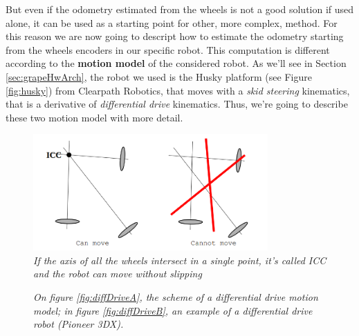 But even if the odometry estimated from the wheels is not a good solution if used alone, it can be used as a starting point for other, more complex, method. For this reason we are now going to descript how to estimate the odometry starting from the wheels encoders in our specific robot. This computation is different according to the \textbf{motion model} of the considered robot. As we'll see in Section \ref{sec:grapeHwArch}, the robot we used is the Husky platform (see Figure \ref{fig:husky}) from Clearpath Robotics, that moves with a  \textit{skid steering} kinematics, that is a derivative of \textit{differential drive} kinematics. Thus, we're going to describe these two motion model with more detail.


\begin{figure}
	\centering
	\includegraphics[width=0.8\textwidth]{Images/background_and_tools/icc.png}
	\caption{\textit{If the axis of all the wheels intersect in a single point, it's called ICC and the robot can move without slipping}}
	\label{fig:icc}
\end{figure}


\begin{figure}
	\centering
	\qquad
	\caption{\textit{On figure \ref{fig:diffDriveA}, the scheme of a differential drive motion model; in figure \ref{fig:diffDriveB}, an example of a differential drive robot (Pioneer 3DX).}}
	\label{fig:diffDrive}
\end{figure}

